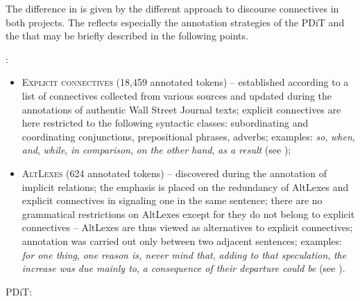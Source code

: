 \documentclass[output=paper]{langsci/langscibook.cls}
\begin{document}
The difference in  is given by the different approach to discourse connectives in both projects. The  reflects especially the annotation strategies of the PDiT and the  that may be briefly described in the following points.

\vspace{\baselineskip}
\noindent {}:

\begin{itemize}

\item \textsc{Explicit connectives} (18,459 annotated tokens) – established according to a list of connectives collected from various sources \citep[cf. e.g.][]{halliday2014cohesion,martin1992english} and updated during the annotations of authentic Wall Street Journal texts; explicit connectives are here restricted to the following syntactic classes: subordinating and coordinating conjunctions, prepositional phrases, adverbs; examples: \textit{so}, \textit{when}, \textit{and}, \textit{while}, \textit{in comparison}, \textit{on the other hand}, \textit{as a result} (see \citealt{prasad2010realization});


\item \textsc{AltLexes} (624 annotated tokens) – discovered during the annotation of implicit relations; the emphasis is placed on the redundancy of AltLexes and explicit connectives in signaling one  in the same sentence; there are no grammatical restrictions on AltLexes except for they do not belong to explicit connectives – AltLexes are thus viewed as alternatives to explicit connectives; annotation was carried out only between two adjacent sentences; examples: \textit{for one thing}, \textit{one reason is, never mind that}, \textit{adding to that speculation}, \textit{the increase was due mainly to}, \textit{a consequence of their departure could be} (see \citealt{prasad2010realization}).

\end{itemize}

\vspace{\baselineskip}
\noindent PDiT:
\end{document}
